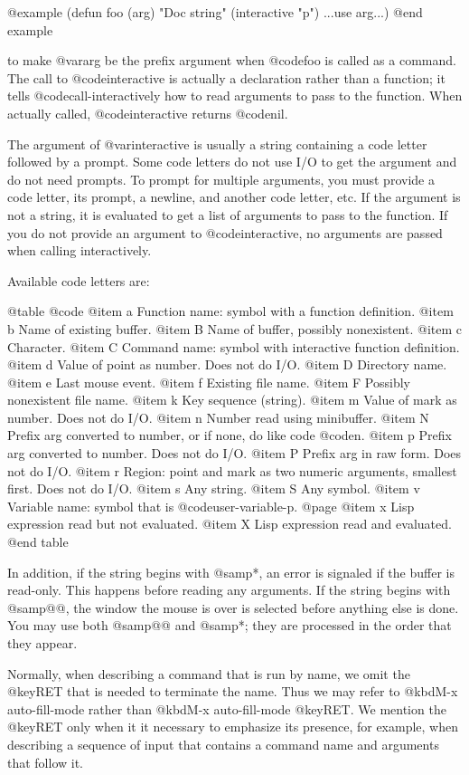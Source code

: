 {{@example
  (defun foo (arg) "Doc string" (interactive "p") ...use arg...)
@end example

to make @var{arg} be the prefix argument when @code{foo} is called as a
command.  The call to @code{interactive} is actually a declaration
rather than a function; it tells @code{call-interactively} how to read
arguments to pass to the function.  When actually called, @code{interactive}
returns @code{nil}.

The argument of @var{interactive} is usually a string containing a code
letter followed by a prompt.  Some code letters do not use I/O to get
the argument and do not need prompts.  To prompt for multiple arguments,
you must provide a code letter, its prompt, a newline, and another code
letter, etc.  If the argument is not a string, it is evaluated to get a
list of arguments to pass to the function.  If you do not provide an
argument to @code{interactive}, no arguments are passed when calling
interactively.

Available code letters are:

@table @code
@item a
Function name: symbol with a function definition.
@item b
Name of existing buffer.
@item B
Name of buffer, possibly nonexistent.
@item c
Character.
@item C
Command name: symbol with interactive function definition.
@item d
Value of point as number.  Does not do I/O.
@item D
Directory name.
@item e
Last mouse event.
@item f
Existing file name.
@item F
Possibly nonexistent file name.
@item k
Key sequence (string).
@item m
Value of mark as number.  Does not do I/O.
@item n
Number read using minibuffer.
@item N
Prefix arg converted to number, or if none, do like code @code{n}.
@item p
Prefix arg converted to number.  Does not do I/O.
@item P
Prefix arg in raw form.  Does not do I/O.
@item r
Region: point and mark as two numeric arguments, smallest first.  Does
not do I/O.
@item s
Any string.
@item S
Any symbol.
@item v
Variable name: symbol that is @code{user-variable-p}.
@page
@item x
Lisp expression read but not evaluated.
@item X
Lisp expression read and evaluated.
@end table

In addition, if the string begins with @samp{*}, an error is
signaled if the buffer is read-only.  This happens before reading any
arguments.  If the string begins with @samp{@@}, the window the mouse is
over is selected before anything else is done.  You may use both
@samp{@@} and @samp{*}; they are processed in the order that they appear.

Normally, when describing a command that is run by name, we omit the
@key{RET} that is needed to terminate the name.  Thus we may refer to
@kbd{M-x auto-fill-mode} rather than @kbd{M-x auto-fill-mode} @key{RET}.
We mention the @key{RET} only when it it necessary to emphasize its
presence, for example, when describing a sequence of input that contains
a command name and arguments that follow it.

}}
